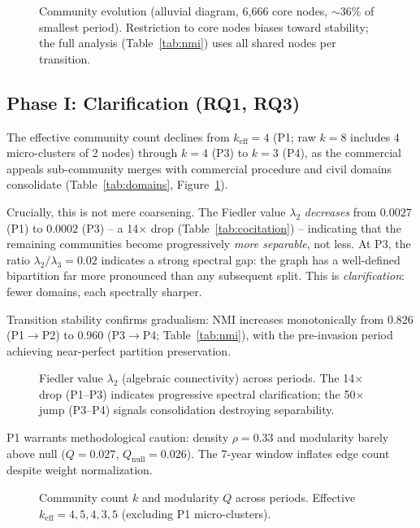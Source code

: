 \documentclass[11pt]{article}
\begin{document}
\begin{figure}[t]
\centering

\caption{Community evolution (alluvial diagram, 6{,}666 core nodes, ${\sim}36\%$ of smallest period). Restriction to core nodes biases toward stability; the full analysis (Table~\ref{tab:nmi}) uses all shared nodes per transition.}
\label{fig:alluvial}
\end{figure}

\subsection{Phase I: Clarification (RQ1, RQ3)}

The effective community count declines from $k_{\text{eff}} = 4$ (P1; raw $k=8$ includes 4 micro-clusters of 2 nodes) through $k=4$ (P3) to $k=3$ (P4), as the commercial appeals sub-community merges with commercial procedure and civil domains consolidate (Table~\ref{tab:domains}, Figure~\ref{fig:alluvial}).

Crucially, this is not mere coarsening.
The Fiedler value $\lambda_2$ \emph{decreases} from $0.0027$ (P1) to $0.0002$ (P3) -- a 14$\times$ drop (Table~\ref{tab:cocitation}) -- indicating that the remaining communities become progressively \emph{more separable}, not less.
At P3, the ratio $\lambda_2/\lambda_3 = 0.02$ indicates a strong spectral gap: the graph has a well-defined bipartition far more pronounced than any subsequent split.
This is \emph{clarification}: fewer domains, each spectrally sharper.

Transition stability confirms gradualism: NMI increases monotonically from $0.826$ (P1$\to$P2) to $0.960$ (P3$\to$P4; Table~\ref{tab:nmi}), with the pre-invasion period achieving near-perfect partition preservation.

\begin{figure}[t]
\centering

\caption{Fiedler value $\lambda_2$ (algebraic connectivity) across periods. The 14$\times$ drop (P1--P3) indicates progressive spectral clarification; the 50$\times$ jump (P3--P4) signals consolidation destroying separability.}
\label{fig:spectral}
\end{figure}

P1 warrants methodological caution: density $\rho = 0.33$ and modularity barely above null ($Q = 0.027$, $Q_{\text{null}} = 0.026$).
The 7-year window inflates edge count despite weight normalization.

\begin{figure}[t]
\centering

\caption{Community count $k$ and modularity $Q$ across periods. Effective $k_{\text{eff}} = 4, 5, 4, 3, 5$ (excluding P1 micro-clusters).}
\label{fig:period_summary}
\end{figure}
\end{document}
